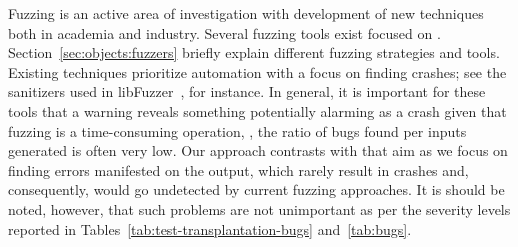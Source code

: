 \documentclass[10pt,conference,anonymous]{IEEEtran}
\begin{document}
Fuzzing is an active area of investigation with development of new
techniques both in academia and industry. Several fuzzing tools exist
focused on \js. Section~\ref{sec:objects:fuzzers} briefly explain
different fuzzing strategies and tools. Existing techniques prioritize
automation with a focus on finding crashes; see the sanitizers used in
libFuzzer~\cite{libfuzzer-tutorial}, for instance. In general, it is
important for these tools that a warning reveals something potentially
alarming as a crash given that fuzzing is a time-consuming operation,
\ie{}, the ratio of bugs found per inputs generated is often very low.
Our approach contrasts with that aim as we focus on finding errors
manifested on the output, which rarely result in crashes and,
consequently, would go undetected by current fuzzing approaches. It is
should be noted, however, that such problems are not unimportant as
per the severity levels reported in
Tables~\ref{tab:test-transplantation-bugs} and~\ref{tab:bugs}.
\end{document}
